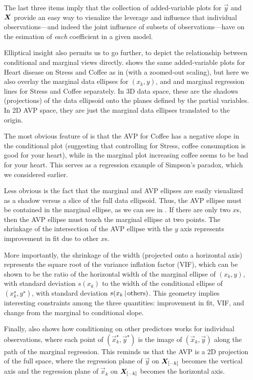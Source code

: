 \begin{enumerate*}
 \item The last three items imply that the collection of added-variable plots for $\vec{y}$ and
 $\bm{X}$ provide an easy way to visualize the leverage and
 influence that individual observations---and indeed the joint influence of subsets of observations---have on
 the esimation of \emph{each} coefficient in a given model.
\end{enumerate*}


Elliptical insight also permits us to go further, to depict the relationship between conditional and marginal views
directly.
 shows the same added-variable plots for Heart disease on Stress and Coffee
as in  (with a zoomed-out scaling), but here we also overlay the
marginal data ellipses for $(x_k, y)$,
and and marginal regression lines for Stress and Coffee separately.  In 3D data space,
these are the shadows (projections) of the data ellipsoid onto the planes defined by the
partial variables.  In 2D AVP space, they are just the marginal data ellipses translated to
the origin.

The most obvious feature of  is that the AVP for Coffee has a negative slope in the conditional
plot (suggesting that controlling for Stress, coffee consumption is good for your heart), while
in the marginal plot increasing coffee seems to be bad for your heart. This serves as a
regression example of Simpson's paradox, which we considered earlier.

Less obvious is the fact that
the marginal and AVP ellipses are easily visualized as a shadow versus a slice of the full data ellipsoid.
Thus, the AVP ellipse must be contained in the marginal ellipse, as we can see in .
If there are only two $x$s, then the AVP ellipse must touch the marginal ellipse at two points.
The shrinkage of the intersection of the AVP ellipse with the $y$ axis represents improvement in fit due to other $x$s.

More importantly, the shrinkage of the width (projected onto a horizontal axis) represents the
square root of the variance inflation factor (VIF), which can be shown to be the ratio of the horizontal
width of the marginal ellipse of $(x_k, y)$, with standard deviation $s(x_k)$ to the width of the conditional
ellipse of $(x_k^\star, y^\star)$, with standard deviation $s(x_k \, | \, \textrm{others})$.
This geometry implies interesting constraints among the three quantities: improvement in fit, VIF, and change from the marginal to conditional slope.

Finally,  also shows how conditioning on other predictors works for individual
observations, where each point of  $(\vec{x}_k^\star, \vec{y}^\star)$ is the image of $(\vec{x}_k, \vec{y})$
along the path of the marginal regression. This reminds us that the AVP is a 2D projection of the full space,
where the regression plane of $\vec{y}$ on $\bm{X}_{[-k]}$ becomes the vertical axis and
the regression plane of $\vec{x}_k$ on $\bm{X}_{[-k]}$ becomes the horizontal axis.

